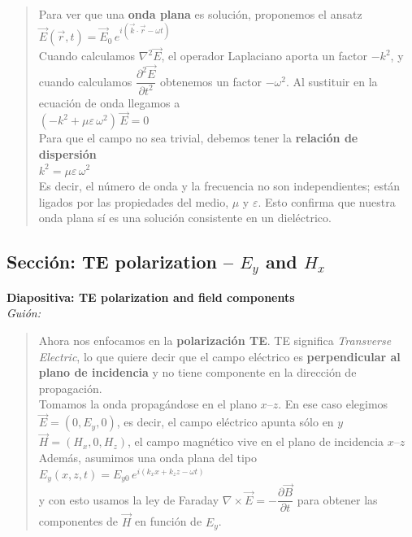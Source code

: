 \documentclass{article}
\begin{document}
\begin{quote}
Para ver que una \textbf{onda plana} es solución, proponemos el ansatz\\[1mm]
\(\vec{E}(\vec{r},t) = \vec{E}_0\,e^{i(\vec{k}\cdot\vec{r} - \omega t)}\)\\[2mm]
Cuando calculamos \(\nabla^2\vec{E}\), el operador Laplaciano aporta un factor \(-k^2\), y cuando 
calculamos \(\dfrac{\partial^2\vec{E}}{\partial t^2}\) obtenemos un factor \(-\omega^2\). 
Al sustituir en la ecuación de onda llegamos a\\[1mm]
\((-k^2 + \mu\varepsilon\,\omega^2)\,\vec{E} = 0\)\\[2mm]
Para que el campo no sea trivial, debemos tener la \textbf{relación de dispersión}\\[1mm]
\(k^2 = \mu\varepsilon\,\omega^2\)\\[2mm]
Es decir, el número de onda y la frecuencia no son independientes; están ligados por las propiedades 
del medio, \(\mu\) y \(\varepsilon\). Esto confirma que nuestra onda plana sí es una solución 
consistente en un dieléctrico.
\end{quote}

\vspace{0.8cm}

\subsection*{Sección: TE polarization -- \(E_y\) and \(H_x\)}

\noindent
\textbf{Diapositiva: TE polarization and field components}\\[2mm]
\textit{Guión:}\\[2mm]

\begin{quote}
Ahora nos enfocamos en la \textbf{polarización TE}. TE significa \textit{Transverse Electric}, 
lo que quiere decir que el campo eléctrico es \textbf{perpendicular al plano de incidencia} y no 
tiene componente en la dirección de propagación.\\[2mm]
Tomamos la onda propagándose en el plano \(x\)--\(z\). En ese caso elegimos\\[1mm]
\(\vec{E} = (0,E_y,0)\), \quad es decir, el campo eléctrico apunta sólo en \(y\)\\
\(\vec{H} = (H_x,0,H_z)\), \quad el campo magnético vive en el plano de incidencia \(x\)--\(z\)\\[2mm]
Además, asumimos una onda plana del tipo\\[1mm]
\(E_y(x,z,t) = E_{y0}\,e^{i(k_x x + k_z z - \omega t)}\)\\[2mm]
y con esto usamos la ley de Faraday \(\nabla\times\vec{E} = -\dfrac{\partial \vec{B}}{\partial t}\) 
para obtener las componentes de \(\vec{H}\) en función de \(E_y\).
\end{quote}
\end{document}
